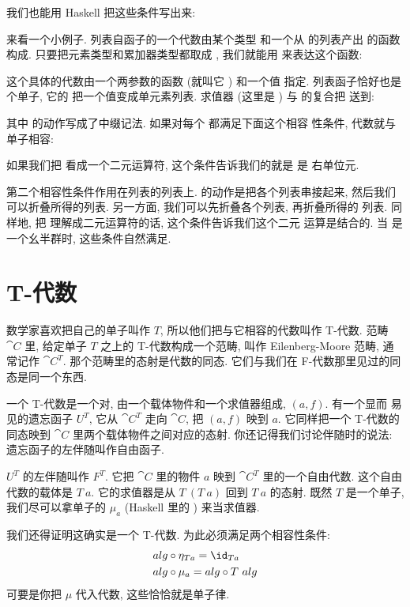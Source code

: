 \noindent
我们也能用 Haskell 把这些条件写出来:

来看一个小例子. 列表自函子的一个代数由某个类型  和一个从 
的列表产出  的函数构成. 只要把元素类型和累加器类型都取成 ,
我们就能用  来表达这个函数:

这个具体的代数由一个两参数的函数 (就叫它 ) 和一个值  指定.
列表函子恰好也是个单子, 它的  把一个值变成单元素列表. 求值器
(这里是 ) 与  的复合把  送到:

其中  的动作写成了中缀记法. 如果对每个  都满足下面这个相容
性条件, 代数就与单子相容:

如果我们把  看成一个二元运算符, 这个条件告诉我们的就是  是
右单位元.

第二个相容性条件作用在列表的列表上.  的动作是把各个列表串接起来,
然后我们可以折叠所得的列表. 另一方面, 我们可以先折叠各个列表, 再折叠所得的
列表. 同样地, 把  理解成二元运算符的话, 这个条件告诉我们这个二元
运算是结合的. 当  是一个幺半群时, 这些条件自然满足.

\section{T-代数}

数学家喜欢把自己的单子叫作 $T$, 所以他们把与它相容的代数叫作 T-代数. 范畴
$\cat{C}$ 里, 给定单子 $T$ 之上的 T-代数构成一个范畴, 叫作 Eilenberg-Moore
范畴, 通常记作 $\cat{C}^T$. 那个范畴里的态射是代数的同态. 它们与我们在
F-代数那里见过的同态是同一个东西.

一个 T-代数是一个对, 由一个载体物件和一个求值器组成, $(a, f)$. 有一个显而
易见的遗忘函子 $U^T$, 它从 $\cat{C}^T$ 走向 $\cat{C}$, 把 $(a, f)$ 映到
$a$. 它同样把一个 T-代数的同态映到 $\cat{C}$ 里两个载体物件之间对应的态射.
你还记得我们讨论伴随时的说法: 遗忘函子的左伴随叫作自由函子.

$U^T$ 的左伴随叫作 $F^T$. 它把 $\cat{C}$ 里的物件 $a$ 映到
$\cat{C}^T$ 里的一个自由代数. 这个自由代数的载体是 $T\ a$. 它的求值器是从
$T\ (T\ a)$ 回到 $T\ a$ 的态射. 既然 $T$ 是一个单子, 我们尽可以拿单子的
$\mu_a$ (Haskell 里的 ) 来当求值器.

我们还得证明这确实是一个 T-代数. 为此必须满足两个相容性条件:
\begin{align*}
  alg & \circ \eta_{Ta} = \id_{Ta}     \\
  alg & \circ \mu_a = alg \circ T\ alg
\end{align*}
可要是你把 $\mu$ 代入代数, 这些恰恰就是单子律.

